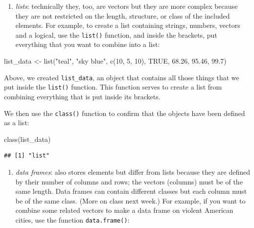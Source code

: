 \documentclass[
]{book}
\newenvironment{Shaded}{\begin{snugshade}}{\end{snugshade}}
\newcommand{\ConstantTok}[1]{\textcolor[rgb]{0.00,0.00,0.00}{#1}}
\newcommand{\DecValTok}[1]{\textcolor[rgb]{0.00,0.00,0.81}{#1}}
\newcommand{\FloatTok}[1]{\textcolor[rgb]{0.00,0.00,0.81}{#1}}
\newcommand{\FunctionTok}[1]{\textcolor[rgb]{0.00,0.00,0.00}{#1}}
\newcommand{\NormalTok}[1]{#1}
\newcommand{\OtherTok}[1]{\textcolor[rgb]{0.56,0.35,0.01}{#1}}
\newcommand{\StringTok}[1]{\textcolor[rgb]{0.31,0.60,0.02}{#1}}
\providecommand{\tightlist}{%
  \setlength{\itemsep}{0pt}\setlength{\parskip}{0pt}}
\begin{document}
\begin{enumerate}
\def\labelenumi{\arabic{enumi}.}
\setcounter{enumi}{1}
\tightlist
\item
  \emph{lists}: technically they, too, are vectors but they are more complex because they are not restricted on the length, structure, or class of the included elements. For example, to create a list containing strings, numbers, vectors and a logical, use the \texttt{list()} function, and inside the brackets, put everything that you want to combine into a list:
\end{enumerate}

\begin{Shaded}
\begin{Highlighting}[]
\NormalTok{list\_data }\OtherTok{\textless{}{-}} \FunctionTok{list}\NormalTok{(}\StringTok{"teal"}\NormalTok{, }\StringTok{"sky blue"}\NormalTok{, }\FunctionTok{c}\NormalTok{(}\DecValTok{10}\NormalTok{, }\DecValTok{5}\NormalTok{, }\DecValTok{10}\NormalTok{), }\ConstantTok{TRUE}\NormalTok{, }\FloatTok{68.26}\NormalTok{, }\FloatTok{95.46}\NormalTok{, }\FloatTok{99.7}\NormalTok{) }
\end{Highlighting}
\end{Shaded}

Above, we created \texttt{list\_data}, an object that contains all those things that we put inside the \texttt{list()} function. This function serves to create a list from combining everything that is put inside its brackets.

We then use the \texttt{class()} function to confirm that the objects have been defined as a list:

\begin{Shaded}
\begin{Highlighting}[]
\FunctionTok{class}\NormalTok{(list\_data)}
\end{Highlighting}
\end{Shaded}

\begin{verbatim}
## [1] "list"
\end{verbatim}

\begin{enumerate}
\def\labelenumi{\arabic{enumi}.}
\setcounter{enumi}{2}
\tightlist
\item
  \emph{data frames}: also stores elements but differ from lists because they are defined by their number of columns and rows; the vectors (columns) must be of the same length. Data frames can contain different classes but each column must be of the same class. (More on class next week.) For example, if you want to combine some related vectors to make a data frame on violent American cities, use the function \texttt{data.frame()}:
\end{enumerate}
\end{document}
